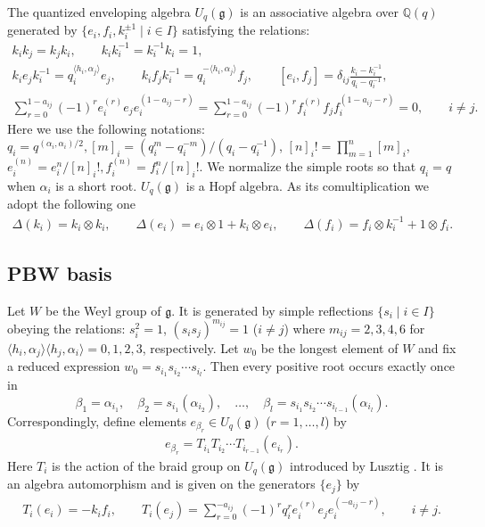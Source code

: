 \documentclass[11pt]{article}
\newcommand{\geh}{\mathfrak{g}}
\newcommand{\ot}{\otimes}
\newcommand{\pair}[1]{\langle{#1}\rangle}
\newcommand{\Q}{{\mathbb Q}}
\begin{document}
The quantized enveloping algebra $U_q(\geh)$ is an associative algebra over $\Q(q)$ generated by
$\{e_i, f_i, k_i^{\pm1} \mid i\in I\}$ satisfying the relations:
\begin{gather}
 k_i k_j=k_j k_i, \qquad
k_i k_i^{-1}=k_i^{-1}k_i=1, \nonumber
\\
 k_i e_j k_i^{-1}=q_i^{\langle h_i,\alpha_j \rangle} e_j, \qquad
k_i f_j k_i^{-1}=q_i^{-\langle h_i, \alpha_j \rangle} f_j, \qquad
[e_i, f_j]=\delta_{ij}\frac{k_i-k_i^{-1}}{q_i-q_i^{-1}}, \nonumber
\\
 \sum_{r=0}^{1-a_{ij}} (-1)^r e_i^{(r)} e_j e_i^{(1-a_{ij}-r)}
=\sum_{r=0}^{1-a_{ij}} (-1)^r f_i^{(r)} f_j f_i^{(1-a_{ij}-r)}=0,\qquad i\neq j.\label{a:serre}
\end{gather}
Here we use the following notations:
$q_i=q^{(\alpha_i,\alpha_i)/2},[m]_i=(q_i^m-q_i^{-m})/(q_i-q_i^{-1})$,
$[n]_i!=\prod\limits_{m=1}^n[m]_i$, $e_i^{(n)}=e_i^n/[n]_i!,f_i^{(n)}=f_i^n/[n]_i!$.
We normalize the simple roots so that $q_i=q$ when
$\alpha_i$ is a short root.
$U_q(\geh)$ is a Hopf algebra. As its comultiplication we adopt the following one
\begin{gather*}
\Delta(k_i)=k_i\ot k_i,\qquad \Delta(e_i)=e_i\ot1+k_i\ot e_i,\qquad \Delta(f_i)=f_i\ot k_i^{-1}+1\ot f_i.
\end{gather*}

\subsection{PBW basis}\label{a:ss:pbw}

Let $W$ be the Weyl group of $\geh$. It is generated by simple ref\/lections $\{s_i\mid i\in I\}$
obeying the relations: $s_i^2=1$, $(s_is_j)^{m_{ij}}=1$ ($i\ne j$) where $m_{ij}=2,3,4,6$ for
$\pair{h_i,\alpha_j}\pair{h_j,\alpha_i}=0,1,2,3$, respectively. Let $w_0$ be the longest element
of $W$ and f\/ix a reduced expression $w_0=s_{i_1}s_{i_2}\cdots s_{i_l}$. Then every positive root
occurs exactly once in
\[
\beta_1=\alpha_{i_1},\quad \beta_2=s_{i_1}(\alpha_{i_2}), \quad \ldots,\quad
\beta_l=s_{i_1}s_{i_2}\cdots s_{i_{l-1}}(\alpha_{i_l}).
\]
Correspondingly, def\/ine elements $e_{\beta_r}\in U_q(\geh)$ ($r=1,\ldots,l$) by
\begin{gather}\label{a:ebdef}
e_{\beta_r}=T_{i_1}T_{i_2}\cdots T_{i_{r-1}}(e_{i_r}).
\end{gather}
Here $T_i$ is the action of the braid group on $U_q(\geh)$ introduced by Lusztig \cite{L2}. It is
an algebra automorphism and is given on the generators $\{e_j\}$ by
\begin{gather*}
T_i(e_i) = -k_if_i,
\qquad
T_i(e_j)=\sum_{r=0}^{-a_{ij}}(-1)^r q_i^r e_i^{(r)}e_je_i^{(-a_{ij}-r)},
\qquad i\neq j.
\end{gather*}
\end{document}
